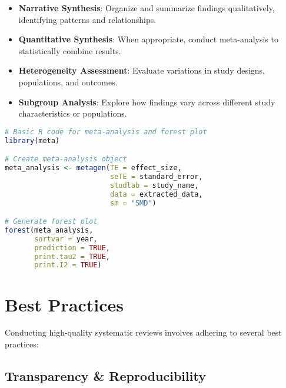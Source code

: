 \begin{itemize}
    \item \textbf{Narrative Synthesis}: Organize and summarize findings qualitatively, identifying patterns and relationships.
    \item \textbf{Quantitative Synthesis}: When appropriate, conduct meta-analysis to statistically combine results.
    \item \textbf{Heterogeneity Assessment}: Evaluate variations in study designs, populations, and outcomes.
    \item \textbf{Subgroup Analysis}: Explore how findings vary across different study characteristics or populations.
\end{itemize}
\begin{commandbox}
\begin{lstlisting}[language=R]
# Basic R code for meta-analysis and forest plot
library(meta)

# Create meta-analysis object
meta_analysis <- metagen(TE = effect_size,
                         seTE = standard_error,
                         studlab = study_name,
                         data = extracted_data,
                         sm = "SMD")

# Generate forest plot
forest(meta_analysis,
       sortvar = year,
       prediction = TRUE,
       print.tau2 = TRUE,
       print.I2 = TRUE)
\end{lstlisting}
\end{commandbox}

\section{Best Practices}

Conducting high-quality systematic reviews involves adhering to several best practices:

\subsection{Transparency \& Reproducibility}

